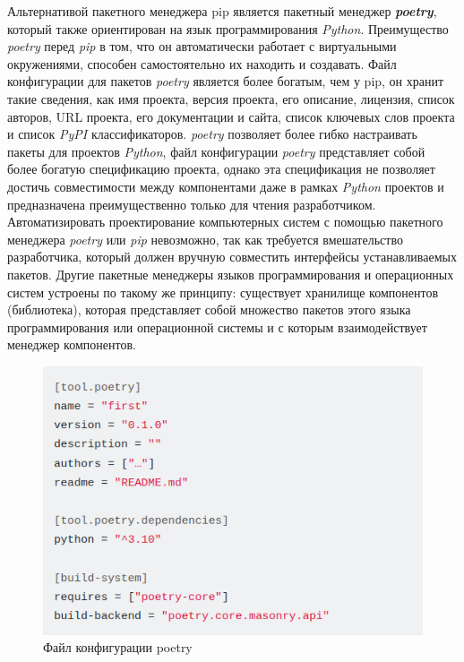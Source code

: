 Альтернативой пакетного менеджера pip является пакетный менеджер \textbf{\textit{poetry}}, который также ориентирован на язык программирования \textit{Python}. Преимущество \textit{poetry} перед \textit{pip} в том, что он автоматически работает с виртуальными окружениями, способен самостоятельно их находить и создавать. Файл конфигурации для пакетов \textit{poetry} является более богатым, чем у pip, он хранит такие сведения, как имя проекта, версия проекта, его описание, лицензия, список авторов, URL проекта, его документации и сайта, список ключевых слов проекта и список \textit{PyPI} классификаторов. \textit{poetry} позволяет более гибко настраивать пакеты для проектов \textit{Python}, файл конфигурации \textit{poetry} представляет собой более богатую спецификацию проекта, однако эта спецификация не позволяет достичь совместимости между компонентами даже в рамках \textit{Python} проектов и предназначена преимущественно только для чтения разработчиком. Автоматизировать проектирование компьютерных систем с помощью пакетного менеджера \textit{poetry} или \textit{pip} невозможно, так как требуется вмешательство разработчика, который должен вручную совместить интерфейсы устанавливаемых пакетов. Другие пакетные менеджеры языков программирования и операционных систем устроены по такому же принципу: существует хранилище компонентов (библиотека), которая представляет собой множество пакетов этого языка программирования или операционной системы и с которым взаимодействует менеджер компонентов.

\begin{figure}[H]
	\includegraphics[scale=0.7]{author/part5/figures/poetry.png}
	\caption{Файл конфигурации poetry}
	\label{fig:poetry}
\end{figure}

